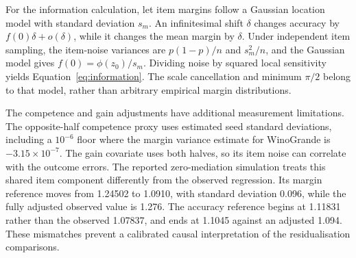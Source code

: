 For the information calculation, let item margins follow a Gaussian location model with standard deviation $s_m$. An infinitesimal shift $\delta$ changes accuracy by $f(0)\delta+o(\delta)$, while it changes the mean margin by $\delta$. Under independent item sampling, the item-noise variances are $p(1-p)/n$ and $s_m^2/n$, and the Gaussian model gives $f(0)=\phi(z_0)/s_m$. Dividing noise by squared local sensitivity yields Equation~\ref{eq:information}. The scale cancellation and minimum $\pi/2$ belong to that model, rather than arbitrary empirical margin distributions.

The competence and gain adjustments have additional measurement limitations. The opposite-half competence proxy uses estimated seed standard deviations, including a $10^{-6}$ floor where the margin variance estimate for WinoGrande is $-3.15\times10^{-7}$. The gain covariate uses both halves, so its item noise can correlate with the outcome errors. The reported zero-mediation simulation treats this shared item component differently from the observed regression. Its margin reference moves from 1.24502 to 1.0910, with standard deviation 0.096, while the fully adjusted observed value is 1.276. The accuracy reference begins at 1.11831 rather than the observed 1.07837, and ends at 1.1045 against an adjusted 1.094. These mismatches prevent a calibrated causal interpretation of the residualisation comparisons.
